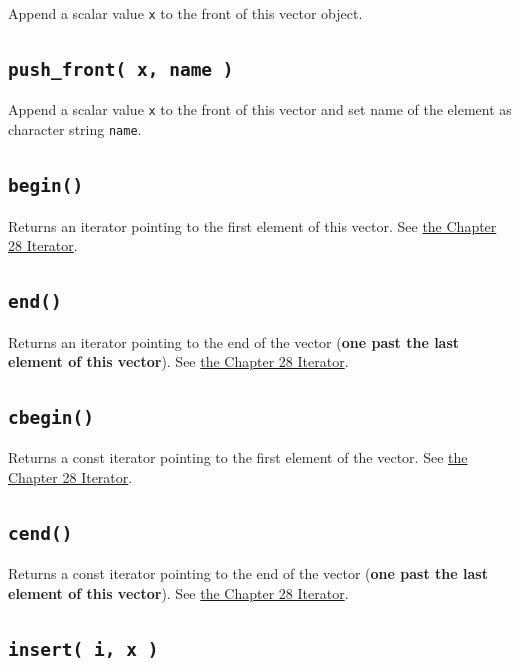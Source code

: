 \documentclass[]{book}
\begin{document}
Append a scalar value \texttt{x} to the front of this vector object.

\hypertarget{push_front-x-name}{%
\subsection{\texorpdfstring{\texttt{push\_front(\ x,\ name\ )}}{push\_front( x, name )}}\label{push_front-x-name}}

Append a scalar value \texttt{x} to the front of this vector and set name of the element as character string \texttt{name}.

\hypertarget{begin}{%
\subsection{\texorpdfstring{\texttt{begin()}}{begin()}}\label{begin}}

Returns an iterator pointing to the first element of this vector. See \href{280_iterator.html}{the Chapter 28 Iterator}.

\hypertarget{end}{%
\subsection{\texorpdfstring{\texttt{end()}}{end()}}\label{end}}

Returns an iterator pointing to the end of the vector (\textbf{one past the last element of this vector}). See \href{280_iterator.html}{the Chapter 28 Iterator}.

\hypertarget{cbegin}{%
\subsection{\texorpdfstring{\texttt{cbegin()}}{cbegin()}}\label{cbegin}}

Returns a const iterator pointing to the first element of the vector. See \href{280_iterator.html}{the Chapter 28 Iterator}.

\hypertarget{cend}{%
\subsection{\texorpdfstring{\texttt{cend()}}{cend()}}\label{cend}}

Returns a const iterator pointing to the end of the vector (\textbf{one past the last element of this vector}). See \href{280_iterator.html}{the Chapter 28 Iterator}.

\hypertarget{insert-i-x}{%
\subsection{\texorpdfstring{\texttt{insert(\ i,\ x\ )}}{insert( i, x )}}\label{insert-i-x}}
\end{document}
